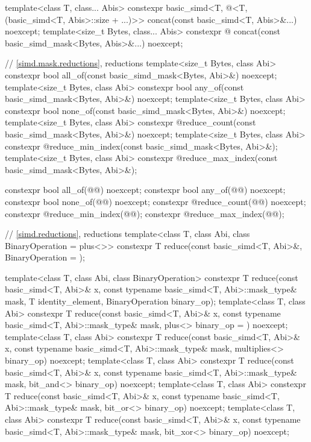 \begin{codeblock}
{  template<class T, class... Abis>
    constexpr basic_simd<T, @\deducet@<T, (basic_simd<T, Abis>::size + ...)>>
      concat(const basic_simd<T, Abis>&...) noexcept;
  template<size_t Bytes, class... Abis>
    constexpr @\seebelow@
      concat(const basic_simd_mask<Bytes, Abis>&...) noexcept;

  // \ref{simd.mask.reductions},  reductions
  template<size_t Bytes, class Abi> constexpr bool all_of(const basic_simd_mask<Bytes, Abi>&) noexcept;
  template<size_t Bytes, class Abi> constexpr bool any_of(const basic_simd_mask<Bytes, Abi>&) noexcept;
  template<size_t Bytes, class Abi> constexpr bool none_of(const basic_simd_mask<Bytes, Abi>&) noexcept;
  template<size_t Bytes, class Abi> constexpr @\simdsizetype@ reduce_count(const basic_simd_mask<Bytes, Abi>&) noexcept;
  template<size_t Bytes, class Abi> constexpr @\simdsizetype@ reduce_min_index(const basic_simd_mask<Bytes, Abi>&);
  template<size_t Bytes, class Abi> constexpr @\simdsizetype@ reduce_max_index(const basic_simd_mask<Bytes, Abi>&);

  constexpr bool all_of(@@) noexcept;
  constexpr bool any_of(@@) noexcept;
  constexpr bool none_of(@@) noexcept;
  constexpr @\simdsizetype@ reduce_count(@@) noexcept;
  constexpr @\simdsizetype@ reduce_min_index(@@);
  constexpr @\simdsizetype@ reduce_max_index(@@);

  // \ref{simd.reductions},  reductions
  template<class T, class Abi, class BinaryOperation = plus<>>
    constexpr T reduce(const basic_simd<T, Abi>&, BinaryOperation = {});

  template<class T, class Abi, class BinaryOperation>
    constexpr T reduce(const basic_simd<T, Abi>& x, const typename basic_simd<T, Abi>::mask_type& mask,
                       T identity_element, BinaryOperation binary_op);
  template<class T, class Abi>
    constexpr T reduce(const basic_simd<T, Abi>& x, const typename basic_simd<T, Abi>::mask_type& mask,
                       plus<> binary_op = {}) noexcept;
  template<class T, class Abi>
    constexpr T reduce(const basic_simd<T, Abi>& x, const typename basic_simd<T, Abi>::mask_type& mask,
                       multiplies<> binary_op) noexcept;
  template<class T, class Abi>
    constexpr T reduce(const basic_simd<T, Abi>& x, const typename basic_simd<T, Abi>::mask_type& mask,
                       bit_and<> binary_op) noexcept;
  template<class T, class Abi>
    constexpr T reduce(const basic_simd<T, Abi>& x, const typename basic_simd<T, Abi>::mask_type& mask,
                       bit_or<> binary_op) noexcept;
  template<class T, class Abi>
    constexpr T reduce(const basic_simd<T, Abi>& x, const typename basic_simd<T, Abi>::mask_type& mask,
                       bit_xor<> binary_op) noexcept;

}
\end{codeblock}
